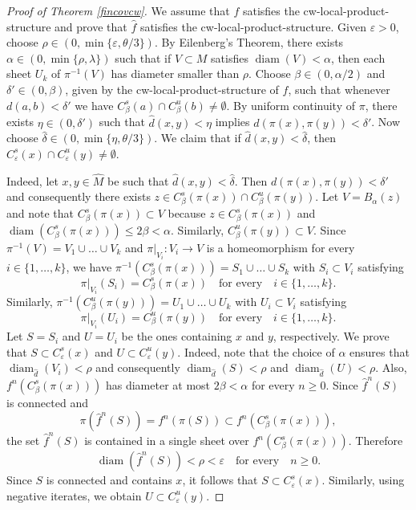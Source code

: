 \documentclass{amsart}
\theoremstyle{plain}
\theoremstyle{definition}
\newcommand{\diam}{\operatorname{diam}}
\begin{document}
\begin{proof}[Proof of Theorem \ref{fincovcw}]
We assume that $f$ satisfies the cw-local-product-structure and prove that $\widehat f$ satisfies the cw-local-product-structure. Given $\varepsilon>0$, choose $\rho\in(0,\min\{\varepsilon,\theta/3\})$. By Eilenberg's Theorem, there exists $\alpha\in(0,\min\{\rho,\lambda\})$ such that if $V\subset M$ satisfies $\operatorname{diam}(V)<\alpha$, then each sheet $U_k$ of $\pi^{-1}(V)$ has diameter smaller than $\rho$. Choose $\beta\in(0,\alpha/2)$ and $\delta'\in(0,\beta)$, given by the cw-local-product-structure of $f$, such that whenever $d(a,b)<\delta'$ we have
$C^s_\beta(a)\cap C^u_\beta(b)\neq\emptyset$. By uniform continuity of $\pi$, there exists $\eta\in(0,\delta')$ such that $\widehat d(x,y)<\eta$ implies $d(\pi(x),\pi(y))<\delta'$. Now choose $\widehat\delta\in(0,\min\{\eta,\theta/3\})$. We claim that if $\widehat d(x,y)<\widehat\delta$, then
$C^s_\varepsilon(x)\cap C^u_\varepsilon(y)\neq\emptyset$.

Indeed, let $x,y\in\widehat M$ be such that $\widehat d(x,y)<\widehat\delta$. Then $d(\pi(x),\pi(y))<\delta'$ and consequently there exists $z\in C^s_\beta(\pi(x))\cap C^u_\beta(\pi(y))$. Let $V=B_{\alpha}(z)$ and note that $C^s_\beta(\pi(x))\subset V$ because $z\in C^s_\beta(\pi(x))$ and $\operatorname{diam}(C^s_\beta(\pi(x)))\leq 2\beta<\alpha$. Similarly, $C^u_\beta(\pi(y))\subset V$. Since $\pi^{-1}(V)=V_1\cup\dots\cup V_k$ and $\pi\vert_{V_i}\colon V_i\to V$ is a homeomorphism for every $i\in\{1,\ldots,k\}$, we have $\pi^{-1}(C^s_\beta(\pi(x)))=S_1\cup\dots\cup S_k$ with $S_i\subset V_i$ satisfying 
$$\pi\vert_{V_i}(S_i)=C^s_\beta(\pi(x)) \,\,\,\,\,\, \text{for every} \,\,\,\,\,\, i\in\{1,\dots,k\}.$$
Similarly, $\pi^{-1}(C^u_\beta(\pi(y)))=U_1\cup\dots\cup U_k$ with $U_i\subset V_i$ satisfying 
$$\pi\vert_{V_i}(U_i)=C^u_\beta(\pi(y)) \,\,\,\,\,\, \text{for every} \,\,\,\,\,\, i\in\{1,\dots,k\}.$$
Let $S=S_i$ and $U=U_i$ be the ones containing $x$ and $y$, respectively. We prove that $S\subset C^s_\varepsilon(x)$ and $U\subset C^u_\varepsilon(y)$. Indeed,  
note that the choice of $\alpha$ ensures that $\diam_{\widehat d}(V_i)<\rho$ and consequently $\diam_{\widehat d}(S)<\rho$ and $\diam_{\widehat d}(U)<\rho$. Also, $f^n(C^s_\beta(\pi(x)))$ has diameter at most $2\beta<\alpha$ for every $n\geq 0$. Since $\widehat f^n(S)$ is connected and
$$\pi(\widehat f^n(S))=f^n(\pi(S))\subset f^n(C^s_\beta(\pi(x))),$$ the set $\widehat f^n(S)$ is contained in a single sheet over $f^n(C^s_\beta(\pi(x)))$. Therefore 
$$\operatorname{diam}(\widehat f^n(S))<\rho<\varepsilon \,\,\,\,\,\, \text{for every} \,\,\,\,\,\, n\geq 0.$$ Since $S$ is connected and contains $x$, it follows that $S\subset C^s_\varepsilon(x)$. Similarly, using negative iterates, we obtain $U\subset C^u_\varepsilon(y)$.


\end{proof}
\end{document}

